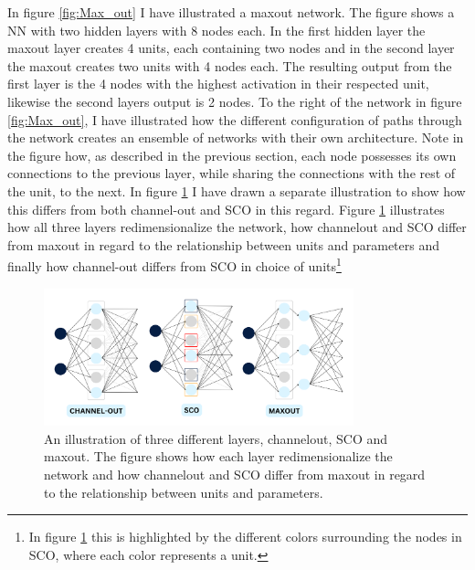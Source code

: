 In figure \ref{fig:Max_out} I have illustrated a maxout network. The figure shows a \ac{NN} with two hidden layers
with 8 nodes each. In the first hidden layer the maxout layer creates 4 units, each containing two nodes and in the 
second layer the maxout creates two units with 4 nodes each. The resulting output from the first layer is the 
4 nodes with the highest activation in their respected unit, likewise the second layers output is 2 nodes.
To the right of the network in figure \ref{fig:Max_out}, I have illustrated how the different configuration of 
paths through the network creates an ensemble of networks with their own architecture. Note in the figure how, as described in the 
previous section, each node possesses its own connections to the previous layer, while sharing the connections with the 
rest of the unit, to the next. In figure \ref{fig:NetEnsembleComp} I have drawn a separate illustration to show how 
this differs from both channel-out and \ac{SCO} in this regard. Figure \ref{fig:NetEnsembleComp} illustrates how 
all three layers redimensionalize the network, how channelout and \ac{SCO} differ from maxout in regard to the relationship 
between units and parameters and finally how channel-out differs from \ac{SCO} in choice of units\footnote{In figure 
\ref{fig:NetEnsembleComp} this is highlighted by the different colors surrounding the nodes in \ac{SCO}, where each color 
represents a unit.}
\begin{figure}
    \centering
    \includegraphics[width=0.8\textwidth]{Figures/Illustrations/EnsembleComp.png}
    \caption[An illustration of three different layers, channelout, \ac{SCO} and maxout.]{An illustration of three different layers, channelout, \ac{SCO} and maxout. The figure shows how each layer 
    redimensionalize the network and how channelout and \ac{SCO} differ from maxout in regard to the relationship 
    between units and parameters.}
    \label{fig:NetEnsembleComp}
\end{figure}
